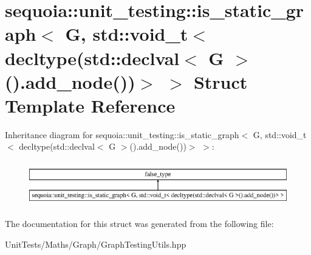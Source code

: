 \hypertarget{structsequoia_1_1unit__testing_1_1is__static__graph_3_01_g_00_01std_1_1void__t_3_01decltype_07stc3339bf3fd9a5b8fb0df2c6deeae3439}{}\section{sequoia\+::unit\+\_\+testing\+::is\+\_\+static\+\_\+graph$<$ G, std\+::void\+\_\+t$<$ decltype(std\+::declval$<$ G $>$().add\+\_\+node())$>$ $>$ Struct Template Reference}
\label{structsequoia_1_1unit__testing_1_1is__static__graph_3_01_g_00_01std_1_1void__t_3_01decltype_07stc3339bf3fd9a5b8fb0df2c6deeae3439}
Inheritance diagram for sequoia\+::unit\+\_\+testing\+::is\+\_\+static\+\_\+graph$<$ G, std\+::void\+\_\+t$<$ decltype(std\+::declval$<$ G $>$().add\+\_\+node())$>$ $>$\+:\begin{figure}[H]
\begin{center}
\leavevmode
\includegraphics[height=1.971831cm]{structsequoia_1_1unit__testing_1_1is__static__graph_3_01_g_00_01std_1_1void__t_3_01decltype_07stc3339bf3fd9a5b8fb0df2c6deeae3439}
\end{center}
\end{figure}


The documentation for this struct was generated from the following file\+:\begin{DoxyCompactItemize}
\item 
Unit\+Tests/\+Maths/\+Graph/Graph\+Testing\+Utils.\+hpp\end{DoxyCompactItemize}
